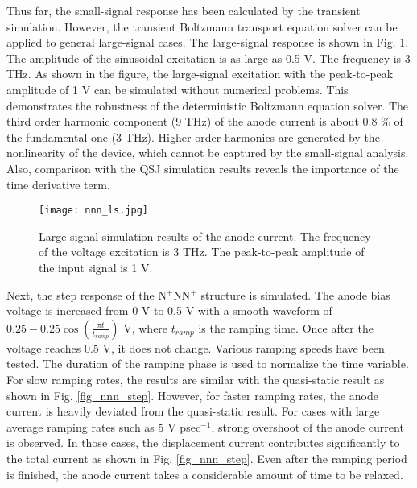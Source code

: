 \documentclass[journal]{IEEEtran}
\newcommand{\revision}[1]{{#1}}
\begin{document}
   Thus far, the small-signal response has been calculated by the transient simulation.
   However, the transient Boltzmann transport equation solver can be applied to general large-signal cases.
   The large-signal response is shown in Fig. \ref{fig_nnn_ls}.    
   The amplitude of the sinusoidal excitation is as large as 0.5 V.
   The frequency is 3 THz.
   As shown in the figure, the large-signal excitation with the peak-to-peak amplitude of 1 V can be simulated without numerical problems.      
   This demonstrates the robustness of the deterministic Boltzmann equation solver.  
   The third order harmonic component (9 THz) of the anode current is about 0.8 $\%$ of the fundamental one (3 THz). 
   Higher order harmonics are generated by the nonlinearity of the device, which cannot be captured by the small-signal analysis.
   Also, comparison with the QSJ simulation results reveals the importance of the time derivative term.
   
\begin{figure}[!t]
\centering
\texttt{[image: nnn\_ls.jpg]}
\caption{\revision{Large-signal simulation results of the anode current. The frequency of the voltage excitation is 3 THz.}
The peak-to-peak amplitude of the input signal is 1 V.}
\label{fig_nnn_ls}
\end{figure}  

   Next, the step response of the  N$^+$NN$^+$ structure is simulated. 
\revision{The anode bias voltage is increased from 0 V to 0.5 V with a smooth waveform of $0.25 - 0.25 \cos(\frac{\pi t}{t_{ramp}})$ V, where $t_{ramp}$ is the ramping time.
   Once after the voltage reaches 0.5 V, it does not change.}
   Various ramping speeds have been tested.
   The duration of the ramping phase is used to normalize the time variable.
   For slow ramping rates, the results are similar with the quasi-static result as shown in Fig. \ref{fig_nnn_step}.
   However, for faster ramping rates, the anode current is heavily deviated from the quasi-static result. 
   For cases with large average ramping rates such as 5 V psec$^{-1}$, strong overshoot of the anode current is observed.   
\revision{In those cases, the displacement current contributes significantly to the total current as shown in Fig. \ref{fig_nnn_step}.}
   Even after the ramping period is finished, the anode current takes a considerable amount of time to be relaxed. 
\end{document}
